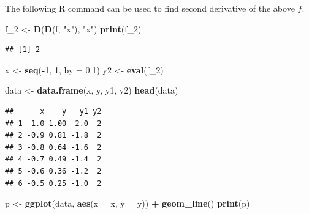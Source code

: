 \documentclass[
]{book}
\newenvironment{Shaded}{\begin{snugshade}}{\end{snugshade}}
\newcommand{\AttributeTok}[1]{\textcolor[rgb]{0.13,0.29,0.53}{#1}}
\newcommand{\DecValTok}[1]{\textcolor[rgb]{0.00,0.00,0.81}{#1}}
\newcommand{\FloatTok}[1]{\textcolor[rgb]{0.00,0.00,0.81}{#1}}
\newcommand{\FunctionTok}[1]{\textcolor[rgb]{0.13,0.29,0.53}{\textbf{#1}}}
\newcommand{\NormalTok}[1]{#1}
\newcommand{\OtherTok}[1]{\textcolor[rgb]{0.56,0.35,0.01}{#1}}
\newcommand{\SpecialCharTok}[1]{\textcolor[rgb]{0.81,0.36,0.00}{\textbf{#1}}}
\newcommand{\StringTok}[1]{\textcolor[rgb]{0.31,0.60,0.02}{#1}}
\begin{document}
The following R command can be used to find second derivative of the above \(f\).

\begin{Shaded}
\begin{Highlighting}[]
\NormalTok{f\_2 }\OtherTok{\textless{}{-}} \FunctionTok{D}\NormalTok{(}\FunctionTok{D}\NormalTok{(f, }\StringTok{"x"}\NormalTok{), }\StringTok{"x"}\NormalTok{)}
\FunctionTok{print}\NormalTok{(f\_2)}
\end{Highlighting}
\end{Shaded}

\begin{verbatim}
## [1] 2
\end{verbatim}

\begin{Shaded}
\begin{Highlighting}[]
\NormalTok{x }\OtherTok{\textless{}{-}} \FunctionTok{seq}\NormalTok{(}\SpecialCharTok{{-}}\DecValTok{1}\NormalTok{, }\DecValTok{1}\NormalTok{, }\AttributeTok{by =} \FloatTok{0.1}\NormalTok{)}
\NormalTok{y2 }\OtherTok{\textless{}{-}} \FunctionTok{eval}\NormalTok{(f\_2)}

\NormalTok{data }\OtherTok{\textless{}{-}} \FunctionTok{data.frame}\NormalTok{(x, y, y1, y2)}
\FunctionTok{head}\NormalTok{(data)}
\end{Highlighting}
\end{Shaded}

\begin{verbatim}
##      x    y   y1 y2
## 1 -1.0 1.00 -2.0  2
## 2 -0.9 0.81 -1.8  2
## 3 -0.8 0.64 -1.6  2
## 4 -0.7 0.49 -1.4  2
## 5 -0.6 0.36 -1.2  2
## 6 -0.5 0.25 -1.0  2
\end{verbatim}

\begin{Shaded}
\begin{Highlighting}[]
\NormalTok{p }\OtherTok{\textless{}{-}} \FunctionTok{ggplot}\NormalTok{(data, }\FunctionTok{aes}\NormalTok{(}\AttributeTok{x =}\NormalTok{ x, }\AttributeTok{y =}\NormalTok{ y)) }\SpecialCharTok{+}
  \FunctionTok{geom\_line}\NormalTok{()}
\FunctionTok{print}\NormalTok{(p)}
\end{Highlighting}
\end{Shaded}
\end{document}
